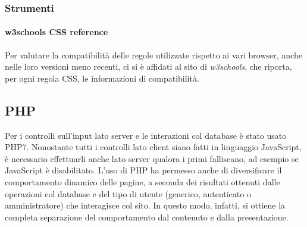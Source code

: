 \subsubsection{Strumenti}
\label{implementazione-css-strumenti}

\paragraph{w3schools CSS reference}
\label{implementazione-css-strumenti-w3schools-reference}
Per valutare la compatibilità delle regole utilizzate rispetto ai vari browser, anche nelle loro versioni meno recenti, ci si è affidati al sito di \textit{w3schools}, che riporta, per ogni regola CSS, le informazioni di compatibilità.

\subsection{PHP}
\label{implementazione-php}
Per i controlli sull'input lato server e le interazioni col database è stato usato PHP7. Nonostante tutti i controlli lato client siano fatti in linguaggio JavaScript, è necessario effettuarli anche lato server qualora i primi falliscano, ad esempio se JavaScript è disabilitato. L'uso di PHP ha permesso anche di diversificare il comportamento dinamico delle pagine, a seconda dei risultati ottenuti dalle operazioni col database e del tipo di utente (generico, autenticato o amministratore) che interagisce col sito. In questo modo, infatti, si ottiene la completa separazione del comportamento dal contenuto e dalla presentazione.

